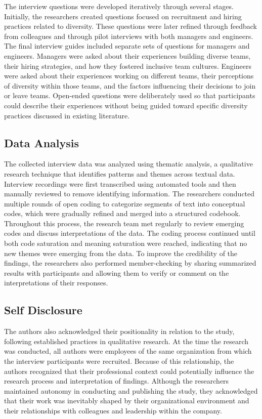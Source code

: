The interview questions were developed iteratively through several stages. Initially, the researchers created questions focused on recruitment and hiring practices related to diversity. These questions were later refined through feedback from colleagues and through pilot interviews with both managers and engineers. The final interview guides included separate sets of questions for managers and engineers. Managers were asked about their experiences building diverse teams, their hiring strategies, and how they fostered inclusive team cultures. Engineers were asked about their experiences working on different teams, their perceptions of diversity within those teams, and the factors influencing their decisions to join or leave teams. Open-ended questions were deliberately used so that participants could describe their experiences without being guided toward specific diversity practices discussed in existing literature.

\subsection{Data Analysis}

The collected interview data was analyzed using thematic analysis, a qualitative research technique that identifies patterns and themes across textual data. Interview recordings were first transcribed using automated tools and then manually reviewed to remove identifying information. The researchers conducted multiple rounds of open coding to categorize segments of text into conceptual codes, which were gradually refined and merged into a structured codebook. Throughout this process, the research team met regularly to review emerging codes and discuss interpretations of the data. The coding process continued until both code saturation and meaning saturation were reached, indicating that no new themes were emerging from the data. To improve the credibility of the findings, the researchers also performed member-checking by sharing summarized results with participants and allowing them to verify or comment on the interpretations of their responses.

\subsection{Self Disclosure}

The authors also acknowledged their positionality in relation to the study, following established practices in qualitative research. At the time the research was conducted, all authors were employees of the same organization from which the interview participants were recruited. Because of this relationship, the authors recognized that their professional context could potentially influence the research process and interpretation of findings. Although the researchers maintained autonomy in conducting and publishing the study, they acknowledged that their work was inevitably shaped by their organizational environment and their relationships with colleagues and leadership within the company.

